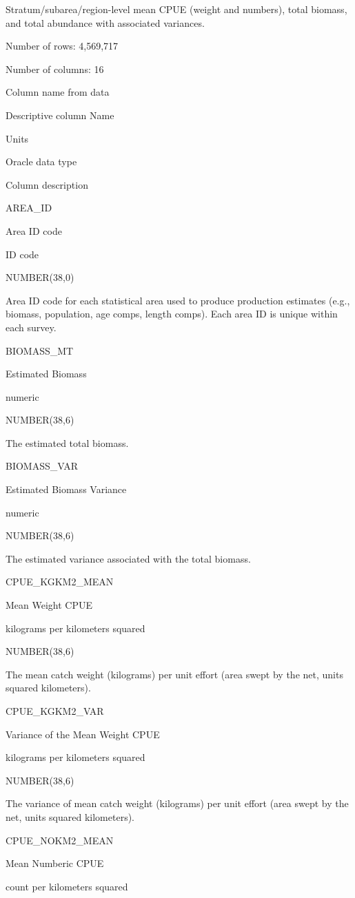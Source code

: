 \documentclass[
  letterpaper,
  oneside,
  open=any]{scrbook}
\begin{document}
Stratum/subarea/region-level mean CPUE (weight and numbers), total
biomass, and total abundance with associated variances.

Number of rows: 4,569,717

Number of columns: 16

Column name from data

Descriptive column Name

Units

Oracle data type

Column description

AREA\_ID

Area ID code

ID code

NUMBER(38,0)

Area ID code for each statistical area used to produce production
estimates (e.g., biomass, population, age comps, length comps). Each
area ID is unique within each survey.

BIOMASS\_MT

Estimated Biomass

numeric

NUMBER(38,6)

The estimated total biomass.

BIOMASS\_VAR

Estimated Biomass Variance

numeric

NUMBER(38,6)

The estimated variance associated with the total biomass.

CPUE\_KGKM2\_MEAN

Mean Weight CPUE

kilograms per kilometers squared

NUMBER(38,6)

The mean catch weight (kilograms) per unit effort (area swept by the
net, units squared kilometers).

CPUE\_KGKM2\_VAR

Variance of the Mean Weight CPUE

kilograms per kilometers squared

NUMBER(38,6)

The variance of mean catch weight (kilograms) per unit effort (area
swept by the net, units squared kilometers).

CPUE\_NOKM2\_MEAN

Mean Numberic CPUE

count per kilometers squared
\end{document}
